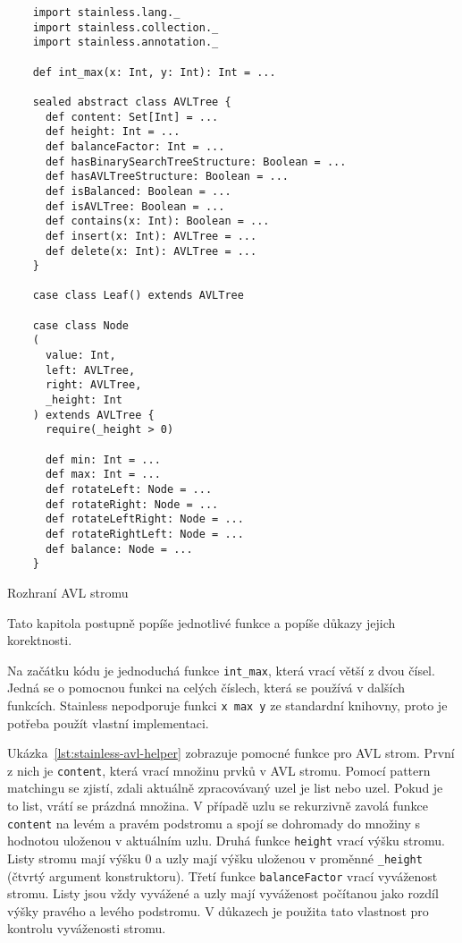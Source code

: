 \begin{listing}[H]
    \begin{verbatim}
    import stainless.lang._
    import stainless.collection._
    import stainless.annotation._

    def int_max(x: Int, y: Int): Int = ...

    sealed abstract class AVLTree {
      def content: Set[Int] = ...
      def height: Int = ...
      def balanceFactor: Int = ...
      def hasBinarySearchTreeStructure: Boolean = ...
      def hasAVLTreeStructure: Boolean = ...
      def isBalanced: Boolean = ...
      def isAVLTree: Boolean = ...
      def contains(x: Int): Boolean = ...
      def insert(x: Int): AVLTree = ...
      def delete(x: Int): AVLTree = ...
    }

    case class Leaf() extends AVLTree

    case class Node
    (
      value: Int,
      left: AVLTree,
      right: AVLTree,
      _height: Int
    ) extends AVLTree {
      require(_height > 0)

      def min: Int = ...
      def max: Int = ...
      def rotateLeft: Node = ...
      def rotateRight: Node = ...
      def rotateLeftRight: Node = ...
      def rotateRightLeft: Node = ...
      def balance: Node = ...
    }
    \end{verbatim}
    \caption{Rozhraní AVL stromu}
    \label{lst:stainless-avl-interface}
\end{listing}

Tato kapitola postupně popíše jednotlivé funkce a popíše důkazy jejich korektnosti.

Na začátku kódu je jednoduchá funkce \texttt{int\_max}, která vrací větší z dvou čísel.
Jedná se o pomocnou funkci na celých číslech, která se používá v dalších funkcích.
Stainless nepodporuje funkci \texttt{x max y} ze standardní knihovny,
proto je potřeba použít vlastní implementaci.

Ukázka~\ref{lst:stainless-avl-helper} zobrazuje pomocné funkce pro AVL strom.
První z nich je \texttt{content}, která vrací množinu prvků v AVL stromu.
Pomocí pattern matchingu se zjistí, zdali aktuálně zpracovávaný uzel je list nebo uzel.
Pokud je to list, vrátí se prázdná množina.
V případě uzlu se rekurzivně zavolá funkce \texttt{content} na levém a pravém podstromu
a spojí se dohromady do množiny s hodnotou uloženou v aktuálním uzlu.
Druhá funkce \texttt{height} vrací výšku stromu.
Listy stromu mají výšku 0 a uzly mají výšku uloženou v proměnné \texttt{\_height} (čtvrtý argument konstruktoru).
Třetí funkce \texttt{balanceFactor} vrací vyváženost stromu.
Listy jsou vždy vyvážené a uzly mají vyváženost počítanou jako rozdíl výšky pravého a levého podstromu.
V důkazech je použita tato vlastnost pro kontrolu vyváženosti stromu.

